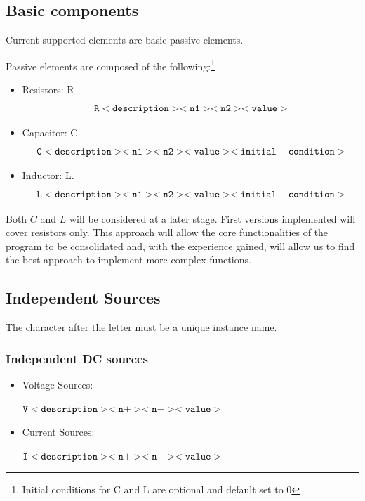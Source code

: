 \documentclass[a4paper, titlepage]{article}
\begin{document}
    \subsection{Basic components}
    Current supported elements are basic passive elements. \par
    Passive elements are composed of the following:\footnote{Initial conditions for C and L are optional and default set to 0}
    \begin{itemize}
        \item Resistors: {\selectfont R} $$ \tt R<description> <n1> <n2> <value> $$
        \item Capacitor: {\selectfont C}. $$ \tt C<description> <n1> <n2> <value><initial-condition>$$ 
        \item Inductor: {\selectfont L}. $$ \tt L<description> <n1> <n2> <value><initial-condition>$$ 
    \end{itemize}
    Both $C$ and $L$ will be considered at a later stage. First versions implemented will cover resistors only. This
    approach will allow the core functionalities of the program to be consolidated and, with the experience gained, 
    will allow us to find the best approach to implement more complex functions.
    \vfill
    
    \subsection{Independent Sources}
    The character after the letter must be a unique instance name.
    \subsubsection{Independent DC sources}
    \begin{itemize}
        \item Voltage Sources: 
        \begin{center}
            $\tt V<description> <n+> <n-><value>$
        \end{center}
        \item Current Sources:
        \begin{center}
            $\tt I<description> <n+> <n-><value>$
        \end{center}
    \end{itemize}
\end{document}

